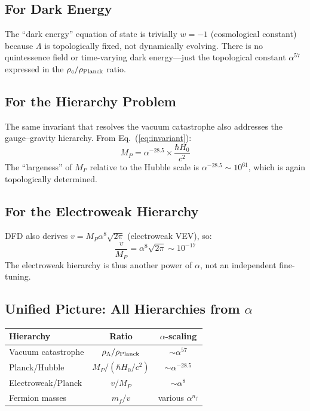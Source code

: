 \documentclass[11pt]{article}
\begin{document}
\subsection{For Dark Energy}

The ``dark energy'' equation of state is trivially $w = -1$ (cosmological constant)
because $\Lambda$ is topologically fixed, not dynamically evolving. There is no
quintessence field or time-varying dark energy---just the topological constant
$\alpha^{57}$ expressed in the $\rho_c/\rho_{\rm Planck}$ ratio.

\subsection{For the Hierarchy Problem}

The same invariant that resolves the vacuum catastrophe also addresses the
gauge--gravity hierarchy. From Eq.~(\ref{eq:invariant}):
\begin{equation}
M_P = \alpha^{-28.5} \times \frac{\hbar H_0}{c^2}
\end{equation}
The ``largeness'' of $M_P$ relative to the Hubble scale is $\alpha^{-28.5} \sim 10^{61}$,
which is again topologically determined.

\subsection{For the Electroweak Hierarchy}

DFD also derives $v = M_P \alpha^8 \sqrt{2\pi}$ (electroweak VEV), so:
\begin{equation}
\frac{v}{M_P} = \alpha^8 \sqrt{2\pi} \sim 10^{-17}
\end{equation}
The electroweak hierarchy is thus another power of $\alpha$, not an independent
fine-tuning.

\subsection{Unified Picture: All Hierarchies from $\alpha$}

\begin{center}
\begin{tabular}{lcc}
\toprule
\textbf{Hierarchy} & \textbf{Ratio} & \textbf{$\alpha$-scaling} \\
\midrule
Vacuum catastrophe & $\rho_\Lambda/\rho_{\rm Planck}$ & $\sim\alpha^{57}$ \\
Planck/Hubble & $M_P / (\hbar H_0/c^2)$ & $\sim\alpha^{-28.5}$ \\
Electroweak/Planck & $v / M_P$ & $\sim\alpha^{8}$ \\
Fermion masses & $m_f / v$ & various $\alpha^{n_f}$ \\
\bottomrule
\end{tabular}
\end{center}
\end{document}
